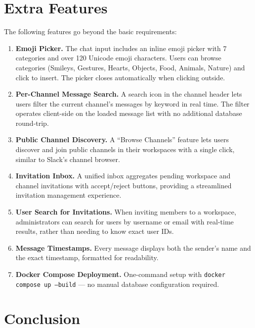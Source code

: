 \documentclass[11pt]{article}
\begin{document}
\newpage
\section{Extra Features}
\label{sec:extra}

The following features go beyond the basic requirements:

\begin{enumerate}
    \item \textbf{Emoji Picker.} The chat input includes an inline emoji picker with 7 categories and over 120 Unicode emoji characters. Users can browse categories (Smileys, Gestures, Hearts, Objects, Food, Animals, Nature) and click to insert. The picker closes automatically when clicking outside.

    \item \textbf{Per-Channel Message Search.} A search icon in the channel header lets users filter the current channel's messages by keyword in real time. The filter operates client-side on the loaded message list with no additional database round-trip.

    \item \textbf{Public Channel Discovery.} A ``Browse Channels'' feature lets users discover and join public channels in their workspaces with a single click, similar to Slack's channel browser.

    \item \textbf{Invitation Inbox.} A unified inbox aggregates pending workspace and channel invitations with accept/reject buttons, providing a streamlined invitation management experience.

    \item \textbf{User Search for Invitations.} When inviting members to a workspace, administrators can search for users by username or email with real-time results, rather than needing to know exact user IDs.

    \item \textbf{Message Timestamps.} Every message displays both the sender's name and the exact timestamp, formatted for readability.

    \item \textbf{Docker Compose Deployment.} One-command setup with \texttt{docker compose up --build} --- no manual database configuration required.
\end{enumerate}


\section{Conclusion}
\end{document}
